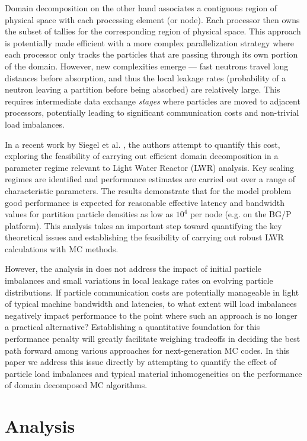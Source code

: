 Domain decomposition on the other hand associates a contiguous region of
physical space with each processing element (or node). Each processor then owns
the subset of tallies for the corresponding region of physical space. This
approach is potentially made efficient with a more complex parallelization
strategy where each processor only tracks the particles that are passing through
its own portion of the domain.  However, new complexities emerge --- fast
neutrons travel long distances before absorption, and thus the local leakage
rates (probability of a neutron leaving a partition before being absorbed) are
relatively large. This requires intermediate data exchange \emph{stages} where
particles are moved to adjacent processors, potentially leading to significant
communication costs and non-trivial load imbalances.

In a recent work by Siegel et al. \cite{jcp-siegel-2012-1}, the authors attempt
to quantify this cost, exploring the feasibility of carrying out efficient
domain decomposition in a parameter regime relevant to Light Water Reactor (LWR)
analysis.  Key scaling regimes are identified and performance estimates are
carried out over a range of characteristic parameters. The results demonstrate
that for the model problem good performance is expected for reasonable effective
latency and bandwidth values for partition particle densities as low as $10^4$
per node (e.g. on the BG/P platform).  This analysis takes an important step
toward quantifying the key theoretical issues and establishing the feasibility
of carrying out robust LWR calculations with MC methods.


However, the analysis in \cite{jcp-siegel-2012-1} does not address the impact of
initial particle imbalances and small variations in local leakage rates on
evolving particle distributions.  If particle communication costs are
potentially manageable in light of typical machine bandwidth and latencies, to
what extent will load imbalances negatively impact performance to the point
where such an approach is no longer a practical alternative?  Establishing a
quantitative foundation for this performance penalty will greatly facilitate
weighing tradeoffs in deciding the best path forward among various approaches
for next-generation MC codes.  In this paper we address this issue directly by
attempting to quantify the effect of particle load imbalances and typical
material inhomogeneities on the performance of domain decomposed MC algorithms.


\section{Analysis}
